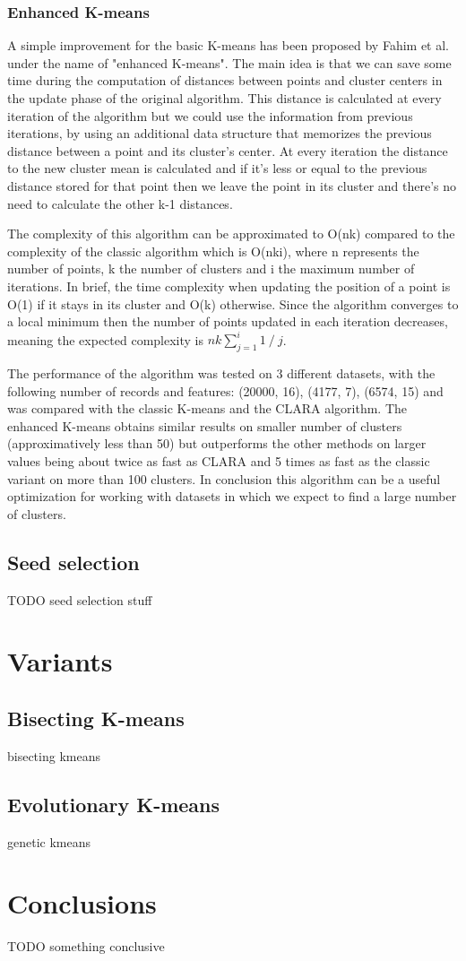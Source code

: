 \documentclass[12pt]{article}
\begin{document}
	\subsubsection{Enhanced K-means}
	A simple improvement for the basic K-means has been proposed by Fahim et al.\cite{EfficientEnhancedKmeans} under the name of "enhanced K-means". The main idea is that we can save some time during the computation of distances between points and cluster centers in the update phase of the original algorithm. This distance is calculated at every iteration of the algorithm but we could use the information from previous iterations, by using an additional data structure that memorizes the previous distance between a point and its cluster's center. At every iteration the distance to the new cluster mean is calculated and if it's less or equal to the previous distance stored for that point then we leave the point in its cluster and there's no need to calculate the other k-1 distances.
	
	The complexity of this algorithm can be approximated to O(nk) compared to the complexity of the classic algorithm which is O(nki), where n represents the number of points, k the number of clusters and i the maximum number of iterations. In brief, the time complexity when updating the position of a point is O(1) if it stays in its cluster and O(k) otherwise. Since the algorithm converges to a local minimum then the number of points updated in each iteration decreases, meaning the expected complexity is \( nk\sum_{j=1}^{i}1\mathbin{/}j \).
	
	The performance of the algorithm was tested on 3 different datasets, with the following number of records and features: (20000, 16), (4177, 7), (6574, 15) and was compared with the classic K-means and the CLARA algorithm. The enhanced K-means obtains similar results on smaller number of clusters (approximatively less than 50) but outperforms the other methods on larger values being about twice as fast as CLARA and 5 times as fast as the classic variant on more than 100 clusters. In conclusion this algorithm can be a useful optimization for working with datasets in which we expect to find a large number of clusters. 
	
	
	\subsection{Seed selection}
	TODO seed selection stuff
	
	\section{Variants}
	\subsection{Bisecting K-means} 
	bisecting kmeans
	
	\subsection{Evolutionary K-means }
	genetic kmeans
	
	
	\section{Conclusions}
	TODO something conclusive
	
	\newpage
	
	
\end{document}
